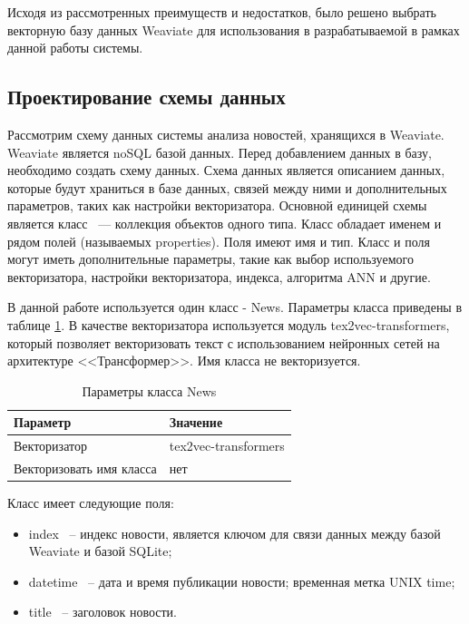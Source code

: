Исходя из рассмотренных преимуществ и недостатков, было решено выбрать векторную базу данных Weaviate для использования в разрабатываемой в рамках данной работы системы.

\subsection{Проектирование схемы данных}
\label{chap:data-scheme}
Рассмотрим схему данных системы анализа новостей, хранящихся в Weaviate. Weaviate является noSQL базой данных. Перед добавлением данных в базу, необходимо создать схему данных. Схема данных является описанием данных, которые будут храниться в базе данных, связей между ними и дополнительных параметров, таких как настройки векторизатора. Основной единицей схемы является класс ~--- коллекция объектов одного типа. Класс обладает именем и рядом полей (называемых properties). Поля имеют имя и тип. Класс и поля могут иметь дополнительные параметры, такие как выбор используемого векторизатора, настройки векторизатора, индекса, алгоритма ANN и другие.

В данной работе используется один класс - News. Параметры класса приведены в таблице \ref{tab:class-news-settings}. В качестве векторизатора используется модуль tex2vec-transformers, который позволяет векторизовать текст с использованием нейронных сетей на архитектуре <<Трансформер>>. Имя класса не векторизуется.

\begin{table}[ht]
    \caption{Параметры класса News}
    \label{tab:class-news-settings}
    \begin{tabularx}{\textwidth}{|X|X|}
        \hline
        Параметр & Значение \\
        \hline
        Векторизатор & tex2vec-transformers \\
        \hline
        Векторизовать имя класса & нет \\
        \hline
    \end{tabularx}
\end{table}

Класс имеет следующие поля:
\begin{itemize}
    \item index ~-- индекс новости, является ключом для связи данных между базой Weaviate и базой SQLite;
    \item datetime ~-- дата и время публикации новости; временная метка UNIX time;
    \item title ~-- заголовок новости.
\end{itemize}


